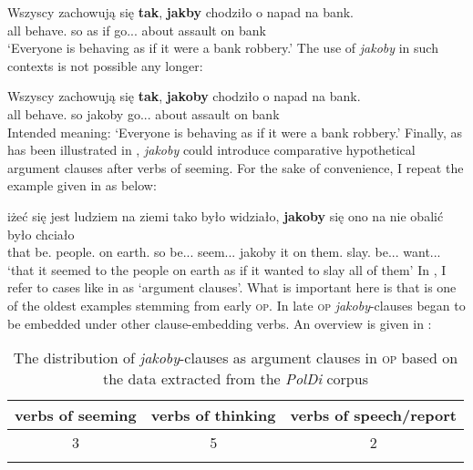 \documentclass[output=paper
,modfonts
,nonflat]{langsci/langscibook}
\begin{document}
\ea \gll Wszyscy zachowują się \textbf{tak}, \textbf{jakby} chodziło o napad na bank. \\
		all behave.{\thirdperson}{\pl} {} so {as if} go.{\lptcp}.{\sg}.{\n} about assault on bank \\
\glt	`Everyone is behaving as if it were a bank robbery.'  
\z
The use of \emph{jakoby} in such contexts is not possible any longer: 

\ea \gll *Wszyscy zachowują się \textbf{tak}, \textbf{jakoby} chodziło o napad na bank. \\
		all behave.{\thirdperson}{\pl} {} so jakoby go.{\lptcp}.{\sg}.{\n} about assault on bank \\
\glt	Intended meaning: `Everyone is behaving as if it were a bank robbery.'
\z
Finally, as has been illustrated in , \emph{jakoby} could introduce comparative hypothetical argument clauses after verbs of seeming. For the sake of convenience, I repeat the example given in  as  below:  

\ea \gll iżeć się jest ludziem na ziemi tako było widziało, \textbf{jakoby} się ono na nie obalić było chciało \label{tee2} \\
			that {} be.{\thirdperson}{\sg} people.{\dat} on earth.{\loc} so be.{\lptcp}.{\sg}.{\n} seem.{\lptcp}.{\sg}.{\n} jakoby {} it on them.{\acc} slay.{\infv} be.{\lptcp}.{\sg}.{\n} want.{\lptcp}.{\sg}.{\n} \\
\glt	`that it seemed to the people on earth as if it wanted to slay all of them' 	
\z
In , I refer to cases like in   as `argument clauses'. What is important here is that  is one of the oldest examples stemming from early \textsc{op}. In late \textsc{op} \emph{jakoby}-clauses began to be embedded under other clause-embedding verbs. An overview is given in : 

 \begin{table}[h]  \begin{tabular}{ccc} 
 \lsptoprule
verbs of seeming & verbs of thinking & verbs of speech\slash report \\
\midrule
3 & 5 & 2  \\
 \lspbottomrule
\end{tabular}
\caption{The distribution of \emph{jakoby}-clauses as argument clauses in \textsc{op} based on the data extracted from the \emph{PolDi} corpus} \label{staropolski_statystka_argument}
\end{table}
\end{document}
